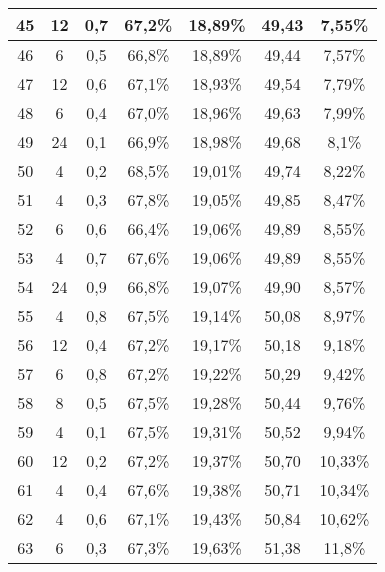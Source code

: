 \begin{longtable}{|c|c|c|c|c|c|c|}
45 & 12 & 0,7 &  67,2\% & 18,89\% & 49,43 & 7,55\% \\ \hline
46 & 6 & 0,5 &  66,8\% & 18,89\% & 49,44 & 7,57\% \\ \hline
47 & 12 & 0,6 &  67,1\% & 18,93\% & 49,54 & 7,79\% \\ \hline
48 & 6 & 0,4 &  67,0\% & 18,96\% & 49,63 & 7,99\% \\ \hline
49 & 24 & 0,1 &  66,9\% & 18,98\% & 49,68 & 8,1\% \\ \hline
50 & 4 & 0,2 &  68,5\% & 19,01\% & 49,74 & 8,22\% \\ \hline
51 & 4 & 0,3 &  67,8\% & 19,05\% & 49,85 & 8,47\% \\ \hline
52 & 6 & 0,6 &  66,4\% & 19,06\% & 49,89 & 8,55\% \\ \hline
53 & 4 & 0,7 &  67,6\% & 19,06\% & 49,89 & 8,55\% \\ \hline
54 & 24 & 0,9 &  66,8\% & 19,07\% & 49,90 & 8,57\% \\ \hline
55 & 4 & 0,8 &  67,5\% & 19,14\% & 50,08 & 8,97\% \\ \hline
56 & 12 & 0,4 &  67,2\% & 19,17\% & 50,18 & 9,18\% \\ \hline
57 & 6 & 0,8 &  67,2\% & 19,22\% & 50,29 & 9,42\% \\ \hline
58 & 8 & 0,5 &  67,5\% & 19,28\% & 50,44 & 9,76\% \\ \hline
59 & 4 & 0,1 &  67,5\% & 19,31\% & 50,52 & 9,94\% \\ \hline
60 & 12 & 0,2 &  67,2\% & 19,37\% & 50,70 & 10,33\% \\ \hline
61 & 4 & 0,4 &  67,6\% & 19,38\% & 50,71 & 10,34\% \\ \hline
62 & 4 & 0,6 &  67,1\% & 19,43\% & 50,84 & 10,62\% \\ \hline
63 & 6 & 0,3 &  67,3\% & 19,63\% & 51,38 & 11,8\% \\ \hline
	\end{longtable}
\normalsize